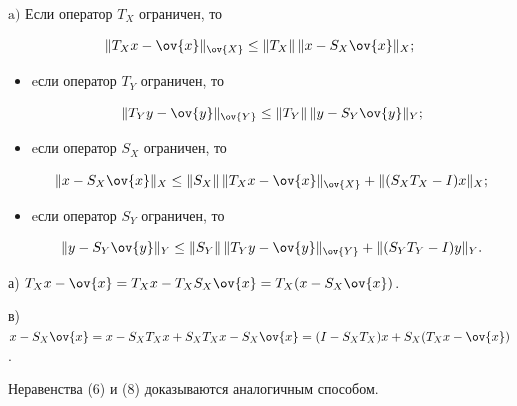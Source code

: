 \begin{lem}


$\mathrm a)$ Если оператор $T_X$ ограничен, то


\begin{equation}


\nr{T_Xx-\ov{x}}_{\ov{X}}\le\nr{T_X}\,\nr{x-S_X\ov{x}}_X;


\end{equation}


\begin{itemize}


\item[б)] eсли оператор $T_Y$ ограничен, то


\begin{equation}


\nr{T_Yy-\ov{y}}_{\ov{Y}}\le\nr{T_Y}\,\nr{y-S_Y\ov{y}}_Y;


\end{equation}


\item[в)] eсли оператор $S_X$ ограничен, то


\begin{equation}


\nr{x-S_X\ov{x}}_X\le\nr{S_X}\,\nr{T_Xx-\ov{x}}_{\ov{X}}+\nr{(S_XT_X-I)x}_X;


\end{equation}


\item[г)] eсли оператор $S_Y$ ограничен, то


\begin{equation}


\nr{y-S_Y\ov{y}}_Y\le\nr{S_Y}\,\nr{T_Yy-\ov{y}}_{\ov{Y}}+\nr{(S_YT_Y-I)y}_Y.


\end{equation}


\end{itemize}


\end{lem}





\begin{pf}


а) $T_Xx-\ov{x} = T_Xx -T_XS_X\ov{x} = T_X(x-S_X\ov{x})$.





в)~$x-S_X\ov{x} = x - S_XT_Xx + S_XT_Xx - S_X\ov{x} =


(I-S_XT_X)x + S_X(T_Xx-\ov{x})$. 





Неравенства (6) и (8) доказываются аналогичным способом.


\end{pf}





